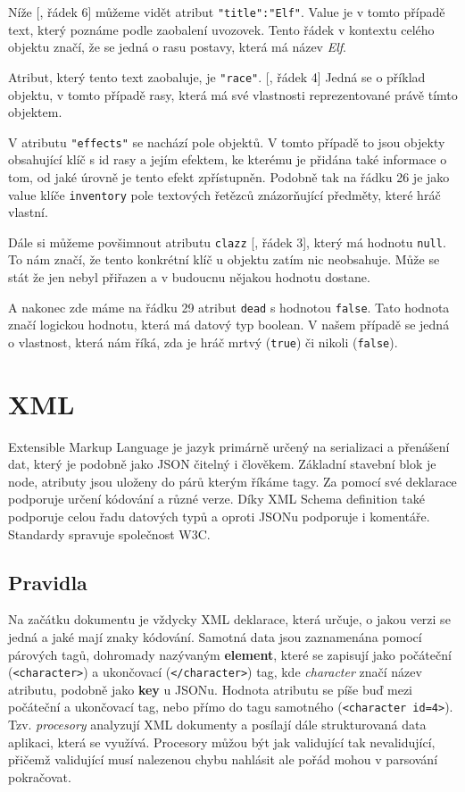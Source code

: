 Níže [, řádek 6] můžeme vidět atribut \verb|"title":"Elf"|. Value je v tomto případě text, který poznáme podle zaobalení uvozovek. Tento řádek v kontextu celého objektu značí, že se jedná o rasu postavy, která má název \textit{Elf}.

Atribut, který tento text zaobaluje, je \texttt{"race"}. [, řádek 4] Jedná se o příklad objektu, v tomto případě rasy, která má své vlastnosti reprezentované právě tímto objektem.

V atributu \texttt{"effects"} se nachází pole objektů. V tomto případě to jsou objekty obsahující klíč s id rasy a jejím efektem, ke kterému je přidána také informace o tom, od jaké úrovně je tento efekt zpřístupněn. Podobně tak na řádku 26 je jako value klíče \texttt{inventory} pole textových řetězců znázorňující předměty, které hráč vlastní.

Dále si můžeme povšimnout atributu \texttt{clazz} [, řádek 3], který má hodnotu \texttt{null}. To nám značí, že tento konkrétní klíč u objektu zatím nic neobsahuje. Může se stát že jen nebyl přiřazen a v budoucnu nějakou hodnotu dostane.

A nakonec zde máme na řádku 29 atribut \texttt{dead} s hodnotou \texttt{false}. Tato hodnota značí logickou hodnotu, která má datový typ boolean. V našem případě se jedná o vlastnost, která nám říká, zda je hráč mrtvý (\texttt{true}) či nikoli (\texttt{false}).


\section{XML}\label{sec:formats:xml}
Extensible Markup Language je jazyk primárně určený na serializaci a přenášení dat, který je podobně jako JSON čitelný i člověkem. Základní stavební blok je node, atributy jsou uloženy do párů kterým říkáme tagy. Za pomocí své deklarace podporuje určení kódování a různé verze. Díky XML Schema definition také podporuje celou řadu datových typů a oproti JSONu podporuje i komentáře. Standardy spravuje společnost W3C. \cite{w3schoolsXML} \cite{zapierDataFormats} \cite{awsXML}


\subsection{Pravidla}\label{sec:formats:xml:rules}
Na začátku dokumentu je vždycky XML deklarace, která určuje, o jakou verzi se jedná a jaké mají znaky kódování.
Samotná data jsou zaznamenána pomocí párových tagů, dohromady nazývaným \textbf{element}, které se zapisují jako počáteční (\texttt{<character>}) a ukončovací (\texttt{</character>}) tag, kde \textit{character} značí název atributu, podobně jako \textbf{key} u JSONu. Hodnota atributu se píše buď mezi počáteční a ukončovací tag, nebo přímo do tagu samotného (\texttt{<character id=4>}). Tzv. \textit{procesory} analyzují XML dokumenty a posílají dále strukturovaná data aplikaci, která se využívá. Procesory můžou být jak validující tak nevalidující, přičemž validující musí nalezenou chybu nahlásit ale pořád mohou v parsování pokračovat. \cite{w3XMLSchema} \cite{enwiki:1218715782}

